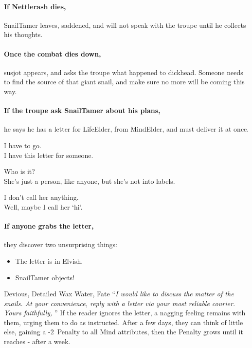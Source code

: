 \paragraph{If Nettlerash dies,}
\gls{SnailTamer} leaves, saddened, and will not speak with the troupe until he collects his thoughts.

\paragraph{Once the combat dies down,}
\gls{susjot} appears, and asks the troupe what happened to \gls{dickhead}.
Someone needs to find the source of that giant snail, and make sure no more will be coming this way.

\paragraph{If the troupe ask \gls{SnailTamer} about his plans,}
he says he has a letter for \gls{LifeElder}, from \gls{MindElder}, and must deliver it at once.

\begin{speechtext}
  I have to go. \\
  I have this letter for someone.

  Who is it? \\
  She's just a person, like anyone, but she's not into labels.

  I don't call her anything. \\
  Well, maybe I call her `hi'.
\end{speechtext}

\paragraph{If anyone grabs the letter,}
they discover two unsurprising things:

\begin{itemize}
  \item
  The letter is in Elvish.
  \item
  \Gls{SnailTamer} objects!
\end{itemize}

  {Devious, Detailed}%
  {Wax}%
  {Water, Fate}%
  {}%
  {``\textit{I would like to discuss the matter of the snails.
  At your convenience, reply with a letter via your most reliable courier.  Yours faithfully, }''}%
  {If the reader ignores the letter, a nagging feeling remains with them, urging them to do as instructed.
  After a few days, they can think of little else, gaining a -2~Penalty to all Mind \glspl{attribute}, then the Penalty grows until it  reaches - after a week.}%


